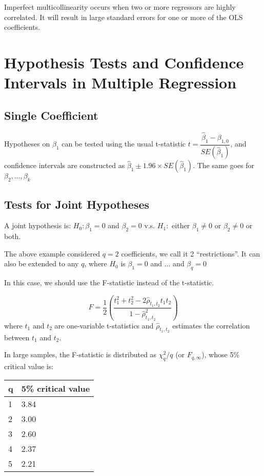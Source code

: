\documentclass{article}
\begin{document}
Imperfect multicollinearity occurs when two or more regressors are highly correlated.
It will result in large standard errors for one or more of the OLS coefficients.

\section{Hypothesis Tests and Confidence Intervals in Multiple Regression}

\subsection{Single Coefficient}

Hypotheses on $\beta_1$ can be tested using the usual t-statistic
$t = \dfrac{\hat{\beta}_1 - \beta_{1,0}}{ SE(\hat{\beta}_1) }$,
and confidence intervals are constructed as $\hat{\beta}_1 \pm 1.96 \times SE(\hat{\beta}_1)$.
The same goes for $\beta_2, \ldots, \beta_k$

\subsection{Tests for Joint Hypotheses}

A joint hypothesis is: $H_0: \beta_1 = 0$ and $\beta_2 = 0$ v.s.
$H_1:$ either $\beta_1 \neq 0$ or $\beta_2 \neq 0$ or both.

The above example considered $q=2$ coefficients,
we call it 2 ``restrictions''.
It can also be extended to any $q$,
where $H_0$ is $\beta_1 = 0$ and $\ldots$ and $\beta_q = 0$

In this case, we should use the F-statistic instead of the t-statistic.

\[
	F = \dfrac{1}{2} \left(
	\dfrac{
		t_1^2 + t_2^2 - 2 \hat{\rho}_{t_1, t_2} t_1 t_2
	}{
		1 - \hat{\rho}^2 _{t_1, t_2}
	}
	\right)
\]
where
$t_1$ and $t_2$ are one-variable t-statistics and
$\hat{\rho} _{t_1, t_2}$ estimates the correlation between $t_1$ and $t_2$.

In large samples, the F-statistic is distributed as $\chi^2_q / q$ (or $F_{q, \infty}$),
whose 5\% critical value is:

\begin{table}[H]
	\centering
	\begin{tabular}{l|l}
		q & 5\% critical value \\\hline
		1 & 3.84               \\
		2 & 3.00               \\
		3 & 2.60               \\
		4 & 2.37               \\
		5 & 2.21
	\end{tabular}
\end{table}
\end{document}
